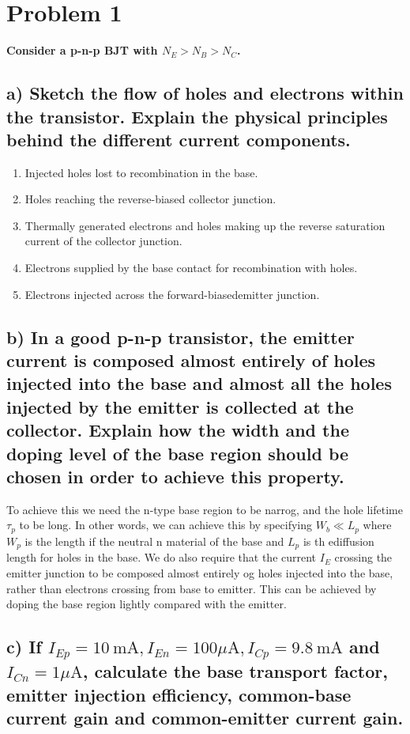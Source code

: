 \section{Problem 1}
\textbf{Consider a p-n-p BJT with $N_E>N_B>N_C$.}
\subsection*{a) Sketch the flow of holes and electrons within the transistor. Explain the physical principles behind the different current components.}
\begin{enumerate}
    \item Injected holes lost to recombination in the base. 
    \item Holes reaching the reverse-biased collector junction.
    \item Thermally generated electrons and holes making up the reverse saturation current of the collector junction.
    \item Electrons supplied by the  base contact for recombination with holes.
    \item Electrons injected across the forward-biasedemitter junction.
\end{enumerate}

\subsection*{b) In a good p-n-p transistor, the emitter current is composed almost entirely of holes injected into the base and almost all the holes injected by the emitter is collected at the collector. Explain how the width and the doping level of the base region should be chosen in order to achieve this property.}

To achieve this we need the n-type base region to be narrog, and the hole lifetime $\tau_p$ to be long. In other words, we can achieve this by specifying $W_b\ll L_p$ where $W_p$ is the length if the neutral n material of the base and $L_p$ is th ediffusion length for holes in the base. We do also require that the current $I_E$ crossing the emitter junction to be composed almost entirely og holes injected into the base, rather than electrons crossing from base to emitter. This can be achieved by doping the base region lightly compared with the emitter.


\subsection*{c) If $I_{Ep}=10 \mathrm{~mA}, I_{En}=100 \mu \mathrm{A}, I_{Cp}=9.8 \mathrm{~mA}$ and $I_{C n}=1 \mu \mathrm{A}$, calculate the base transport factor, emitter injection efficiency, common-base current gain and common-emitter current gain.}

